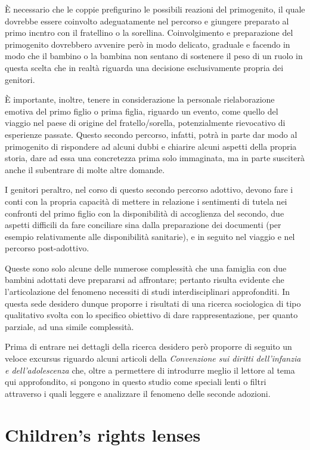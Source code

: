 \documentclass[12pt,oneside,svgnames]{memoir}
\begin{document}
È necessario che le coppie prefigurino le possibili reazioni del
primogenito, il quale dovrebbe essere coinvolto adeguatamente nel
percorso e giungere preparato al primo incntro con il fratellino o la
sorellina. Coinvolgimento e preparazione del primogenito dovrebbero
avvenire però in modo delicato, graduale e facendo in modo che il
bambino o la bambina non sentano di sostenere il peso di un ruolo in
questa scelta che in realtà riguarda una decisione esclusivamente
propria dei genitori.

È importante, inoltre, tenere in considerazione la personale
rielaborazione emotiva del primo figlio o prima figlia, riguardo un
evento, come quello del viaggio nel paese di origine del
fratello/sorella, potenzialmente rievocativo di esperienze passate.
Questo secondo percorso, infatti, potrà in parte dar modo al primogenito
di rispondere ad alcuni dubbi e chiarire alcuni aspetti della propria
storia, dare ad essa una concretezza prima solo immaginata, ma in parte
susciterà anche il subentrare di molte altre domande.

I genitori peraltro, nel corso di questo secondo percorso adottivo,
devono fare i conti con la propria capacità di mettere in relazione i
sentimenti di tutela nei confronti del primo figlio con la disponibilità
di accoglienza del secondo, due aspetti difficili da fare conciliare
sina dalla preparazione dei documenti (per esempio relativamente alle
disponibilità sanitarie), e in seguito nel viaggio e nel percorso
post-adottivo.

Queste sono solo alcune delle numerose complessità che una famiglia con
due bambini adottati deve prepararsi ad affrontare; pertanto risulta
evidente che l'articolazione del fenomeno necessiti di studi
interdisciplinari approfonditi. In questa sede desidero dunque proporre
i risultati di una ricerca sociologica di tipo qualitativo svolta con lo
specifico obiettivo di dare rappresentazione, per quanto parziale, ad
una simile complessità.

Prima di entrare nei dettagli della ricerca desidero però proporre di
seguito un veloce excursus riguardo alcuni articoli della
\emph{Convenzione sui diritti dell'infanzia e dell'adolescenza }che,
oltre a permettere di introdurre meglio il lettore al tema qui
approfondito, si pongono in questo studio come speciali lenti o filtri
attraverso i quali leggere e analizzare il fenomeno delle seconde
adozioni.

\chapter{Children's rights lenses}\label{childrens-rights-lenses}
\end{document}
